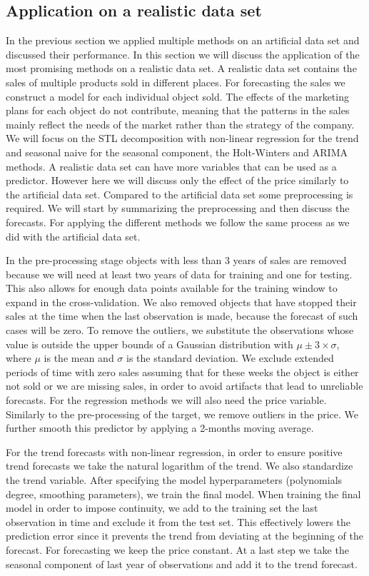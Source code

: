 \documentclass[12pt, letterpaper]{article}\usepackage[]{graphicx}\usepackage[]{color}
\begin{document}
\newpage
\subsection{Application on a realistic data set}

In the previous section we applied multiple methods on an artificial data set and discussed their performance. In this section we will discuss the application of the most promising methods on a realistic data set. A realistic data set contains the sales of multiple products sold in different places. For forecasting the sales we construct a model for each individual object sold. The effects of the marketing plans for each object do not contribute, meaning that the patterns in the sales mainly reflect the needs of the market rather than the strategy of the company. We will focus on the STL decomposition with non-linear regression for the trend and seasonal naive for the seasonal component, the Holt-Winters and ARIMA methods. A realistic data set can have more variables that can be used as a predictor. However here we will discuss only the effect of the price similarly to the artificial data set. Compared to the artificial data set some preprocessing is required. We will start by summarizing the preprocessing and then discuss the forecasts. For applying the different methods we follow the same process as we did with the artificial data set.

In the pre-processing stage objects with less than 3 years of sales are removed because we will need at least two years of data for training and one for testing. This also allows for enough data points available for the training window to expand in the cross-validation. We also removed objects that have stopped their sales at the time when the last observation is made, because the forecast of such cases will be zero. To remove the outliers, we substitute the observations whose value is outside the upper bounds of a Gaussian distribution with $\mu \pm 3\times \sigma$, where $\mu$ is the mean and $\sigma$ is the standard deviation. We exclude extended periods of time with zero sales assuming that for these weeks the object is either not sold or we are missing sales, in order to avoid artifacts that lead to unreliable forecasts. For the regression methods we will also need the price variable. Similarly to the pre-processing of the target, we remove outliers in the price. We further smooth this predictor by applying a 2-months moving average.

For the trend forecasts with non-linear regression, in order to ensure positive trend forecasts we take the natural logarithm of the trend. We also standardize the trend variable. After specifying the model hyperparameters (polynomials degree, smoothing parameters), we train the final model. When training the final model in order to impose continuity, we add to the training set the last observation in time and exclude it from the test set. This effectively lowers the prediction error since it prevents the trend from deviating at the beginning of the forecast. For forecasting we keep the price constant. At a last step we take the seasonal component of last year of observations and add it to the trend forecast.
\end{document}
